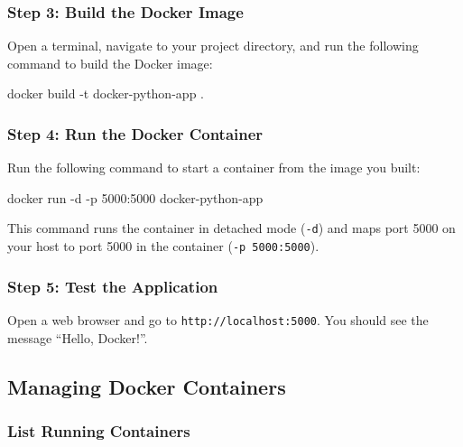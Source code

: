 \documentclass[
  letterpaper,
  DIV=11,
  numbers=noendperiod]{scrreprt}
\newenvironment{Shaded}{\begin{snugshade}}{\end{snugshade}}
\newcommand{\AttributeTok}[1]{\textcolor[rgb]{0.40,0.45,0.13}{#1}}
\newcommand{\ExtensionTok}[1]{\textcolor[rgb]{0.00,0.23,0.31}{#1}}
\newcommand{\NormalTok}[1]{\textcolor[rgb]{0.00,0.23,0.31}{#1}}
\begin{document}
\subsubsection{Step 3: Build the Docker
Image}\label{step-3-build-the-docker-image}

Open a terminal, navigate to your project directory, and run the
following command to build the Docker image:

\begin{Shaded}
\begin{Highlighting}[]
\ExtensionTok{docker}\NormalTok{ build }\AttributeTok{{-}t}\NormalTok{ docker{-}python{-}app .}
\end{Highlighting}
\end{Shaded}

\subsubsection{Step 4: Run the Docker
Container}\label{step-4-run-the-docker-container}

Run the following command to start a container from the image you built:

\begin{Shaded}
\begin{Highlighting}[]
\ExtensionTok{docker}\NormalTok{ run }\AttributeTok{{-}d} \AttributeTok{{-}p}\NormalTok{ 5000:5000 docker{-}python{-}app}
\end{Highlighting}
\end{Shaded}

This command runs the container in detached mode (\texttt{-d}) and maps
port 5000 on your host to port 5000 in the container
(\texttt{-p\ 5000:5000}).

\subsubsection{Step 5: Test the
Application}\label{step-5-test-the-application}

Open a web browser and go to \texttt{http://localhost:5000}. You should
see the message ``Hello, Docker!''.

\subsection{Managing Docker
Containers}\label{managing-docker-containers}

\subsubsection{List Running Containers}\label{list-running-containers}
\end{document}
